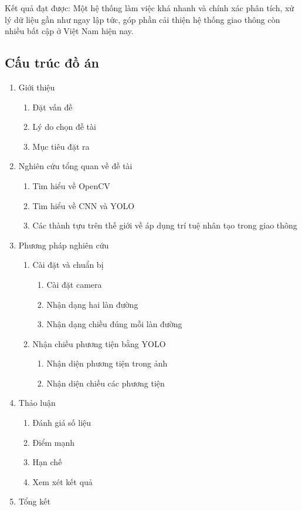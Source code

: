 \documentclass[12pt,twoside,a4paper]{article}
\begin{document}
Kết quả đạt được: Một hệ thống làm việc khá nhanh và chính xác phân tích, xử lý dữ liệu gần như ngay lập tức, góp phần cải thiện hệ thống giao thông còn nhiều bất cập ở Việt Nam hiện nay.

\subsection{Cấu trúc đồ án}
\renewcommand{\labelenumi}{Chương \arabic{enumi}:}
\renewcommand{\labelenumii}{\arabic{enumi}.\arabic{enumii}.}
\renewcommand{\labelenumiii}{\labelenumii\arabic{enumiii}.}
\large
\begin{enumerate}
	\item Giới thiệu
	\begin{enumerate}
		\item Đặt vấn đề
		\item Lý do chọn đề tài 
		\item Mục tiêu đặt ra
	\end{enumerate}
	\item Nghiên cứu tổng quan về đề tài
	\begin{enumerate}
		\item Tìm hiểu về OpenCV
		\item Tìm hiểu về CNN và YOLO
		\item Các thành tựu trên thế giới về áp dụng trí tuệ nhân tạo trong giao thông
	\end{enumerate}
	\item Phương pháp nghiên cứu
	\begin{enumerate}
		\item Cài đặt và chuẩn bị
		\begin{enumerate}
			\item Cài đặt camera
			\item Nhận dạng hai làn đường
			\item Nhận dạng chiều đúng mỗi làn đường
		\end{enumerate}
		\item Nhận chiều phương tiện bằng YOLO
		\begin{enumerate}
			\item Nhận diện phương tiện trong ảnh
			\item Nhận diện chiều các phương tiện
		\end{enumerate}
	\end{enumerate}
	\item Thảo luận
	\begin{enumerate}
		\item Đánh giá số liệu
		\item Điểm mạnh
		\item Hạn chế
		\item Xem xét kết quả
	\end{enumerate}
	\item Tổng kết
\end{enumerate}
\end{document}
